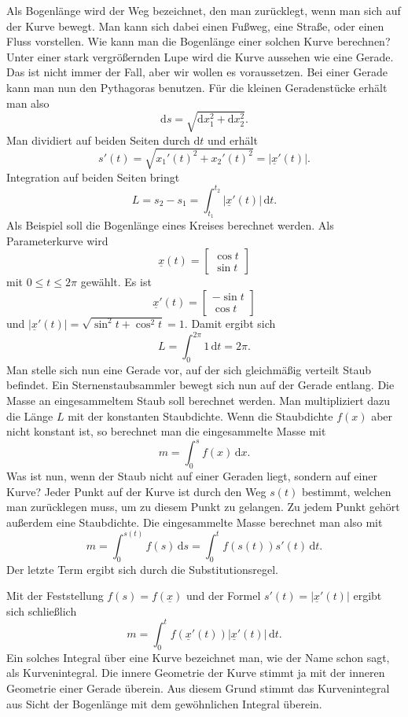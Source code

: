 \documentclass[a4paper,10pt,fleqn,twocolumn,twoside]{article}
\begin{document}
Als Bogenlänge wird der Weg bezeichnet, den man zurücklegt, wenn
man sich auf der Kurve bewegt. Man kann sich dabei einen Fußweg,
eine Straße, oder einen Fluss vorstellen. Wie kann man die
Bogenlänge einer solchen Kurve berechnen?
Unter einer stark vergrößernden Lupe wird die Kurve aussehen wie
eine Gerade. Das ist nicht immer der Fall, aber wir wollen es
voraussetzen. Bei einer Gerade kann man nun den Pythagoras benutzen.
Für die kleinen Geradenstücke erhält man also
\[\mathrm ds = \sqrt{\mathrm dx_1^2+\mathrm dx_2^2}.\]
Man dividiert auf beiden Seiten durch \(\mathrm dt\) und erhält
\[s'(t) = \sqrt{x_1'(t)^2+x_2'(t)^2} = |\underline x'(t)|.\]
Integration auf beiden Seiten bringt
\[L = s_2-s_1 = \int_{t_1}^{t_2} |\underline x'(t)|\,\mathrm dt.\]
%
Als Beispiel soll die Bogenlänge eines Kreises berechnet werden.
Als Parameterkurve wird
\[\underline x(t) = \begin{bmatrix}\cos t\\ \sin t\end{bmatrix}\]
mit \(0\le t\le 2\pi\) gewählt. Es ist
\[\underline x'(t) = \begin{bmatrix}-\sin t\\ \cos t\end{bmatrix}\]
und \(|\underline x'(t)|=\sqrt{\sin^2 t+\cos^2 t}=1\).
Damit ergibt sich
\[L = \int_0^{2\pi} 1\,\mathrm dt=2\pi.\]
%
Man stelle sich nun eine Gerade vor, auf der sich gleichmäßig
verteilt Staub befindet. Ein Sternenstaubsammler bewegt sich nun auf
der Gerade entlang. Die Masse an eingesammeltem Staub soll
berechnet werden. Man multipliziert dazu die Länge \(L\) mit der
konstanten Staubdichte. Wenn die Staubdichte \(f(x)\) aber nicht
konstant ist, so berechnet man die eingesammelte Masse mit
\[m = \int_0^s f(x)\,\mathrm dx.\]
%
Was ist nun, wenn der Staub nicht auf einer Geraden liegt, sondern auf
einer Kurve? Jeder Punkt auf der Kurve ist durch den Weg \(s(t)\)
bestimmt, welchen man zurücklegen muss, um zu diesem Punkt zu
gelangen. Zu jedem Punkt gehört außerdem eine Staubdichte. Die
eingesammelte Masse berechnet man also mit
\[m = \int_0^{s(t)} f(s)\,\mathrm ds
= \int_0^t f(s(t))s'(t)\,\mathrm dt.\]
Der letzte Term ergibt sich durch die Substitutionsregel.

Mit der Feststellung \(f(s) = f(\underline x)\) und der Formel
\(s'(t) = |\underline x'(t)|\) ergibt sich schließlich
\[m = \int_0^t f(\underline x'(t))|\underline x'(t)|\,\mathrm dt.\]
Ein solches Integral über eine Kurve bezeichnet man, wie der Name
schon sagt, als Kurvenintegral. Die innere Geometrie der Kurve stimmt
ja mit der inneren Geometrie einer Gerade überein. Aus diesem Grund
stimmt das Kurvenintegral aus Sicht der Bogenlänge mit dem
gewöhnlichen Integral überein.
\end{document}
